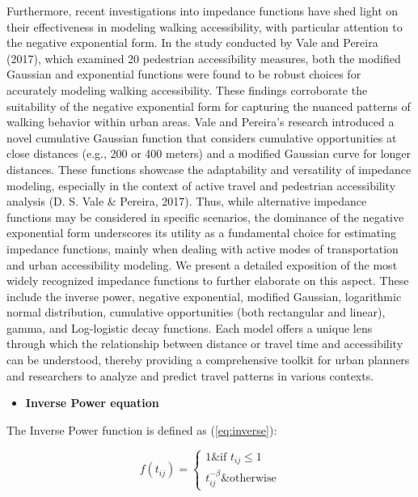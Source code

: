 \documentclass[
11pt, %
oneside, %
english, %
singlespacing, %
]{macthesis} %
\def\tightlist{}
\begin{document}
Furthermore, recent investigations into impedance functions have shed light on their effectiveness in modeling walking accessibility, with particular attention to the negative exponential form. In the study conducted by Vale and Pereira (2017), which examined 20 pedestrian accessibility measures, both the modified Gaussian and exponential functions were found to be robust choices for accurately modeling walking accessibility. These findings corroborate the suitability of the negative exponential form for capturing the nuanced patterns of walking behavior within urban areas. Vale and Pereira's research introduced a novel cumulative Gaussian function that considers cumulative opportunities at close distances (e.g., 200 or 400 meters) and a modified Gaussian curve for longer distances. These functions showcase the adaptability and versatility of impedance modeling, especially in the context of active travel and pedestrian accessibility analysis (D. S. Vale \& Pereira, 2017). Thus, while alternative impedance functions may be considered in specific scenarios, the dominance of the negative exponential form underscores its utility as a fundamental choice for estimating impedance functions, mainly when dealing with active modes of transportation and urban accessibility modeling. We present a detailed exposition of the most widely recognized impedance functions to further elaborate on this aspect. These include the inverse power, negative exponential, modified Gaussian, logarithmic normal distribution, cumulative opportunities (both rectangular and linear), gamma, and Log-logistic decay functions. Each model offers a unique lens through which the relationship between distance or travel time and accessibility can be understood, thereby providing a comprehensive toolkit for urban planners and researchers to analyze and predict travel patterns in various contexts.

\begin{itemize}
\tightlist
\item
  \textbf{Inverse Power equation}
\end{itemize}

The Inverse Power function is defined as (\ref{eq:inverse}):

\begin{equation}
f(t_{ij}) =
\begin{cases}
  1 \& \text{if } t_{ij} \le 1 \\
  t_{ij}^{-\beta} \& \text{otherwise}
\end{cases}
\label{eq:inverse}
\end{equation}
\end{document}
